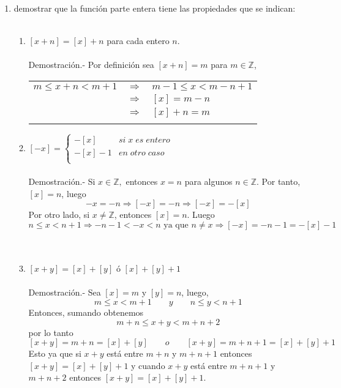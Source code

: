 \begin{enumerate}
\begin{enumerate}[\bfseries (a)]
	\end{enumerate}
	
	\item demostrar que la función parte entera  tiene las propiedades que se indican:\\\\

	\begin{enumerate}[\bfseries (a)]

	    \item $[x+n] = [x] + n$ para cada entero $n$.\\\\
		Demostración.-\; Por definición sea $[x+n]=m$ para $m\in \mathbb{Z}$,
		\begin{center}
		    \begin{tabular}{rcl}
			$m \leq x+n < m+1$ & $\Longrightarrow$ & $m-1 \leq x < m-n+1$\\
			 & $\Longrightarrow$ & $[x]=m-n$\\
			 & $\Longrightarrow$ & $[x]+n=m$\\\\
		    \end{tabular}
		\end{center}

	    \item $[-x] = \left\{ 
		    \begin{array}{ll} 
			-[x] & si \; x \; es \; entero \\ 
			-[x] - 1 & en \; otro \; caso\\
		    \end{array} 
		\right.$ \\\\
		Demostración.-\; Si $x \in \mathbb{Z},$ entonces $x=n$ para algunos $n \in \mathbb{Z}$. Por tanto, $[x]=n$, luego $$-x=-n \Longrightarrow [-x]=-n \Longrightarrow [-x] = -[x]$$
		Por otro lado, si $x \neq \mathbb{Z}$, entonces $[x]=n$. Luego $$n\leq x < n+1 \Longrightarrow -n-1 < -x < n \mbox{ ya que } n\neq x \Longrightarrow [-x] = -n -1 = -[x] - 1$$\\\\
 
	    \item $[x+y] = [x] + [y]$ ó $[x] + [y] + 1$\\\\
		Demostración.-\; Sea $[x]=m$ y $[y]=n$, luego,
		$$m\leq x < m+1 \qquad y \qquad n\leq y < n+1$$ Entonces, sumando obtenemos $$m+n \leq x+y < m+n+2$$  por lo tanto $$[x+y]=m+n=[x]+[y] \qquad o \qquad [x+y] = m+n+1=[x]+[y]+1$$ Esto ya que si $x+y$ está entre $m+n$ y $m+n+1$ entonces $[x+y]=[x] + [y] + 1$ y cuando $x+y$ está entre $m+n+1$ y $m+n+2$ entonces $[x+y] = [x] + [y] + 1.$\\\\ 


\end{enumerate}
\end{enumerate}
